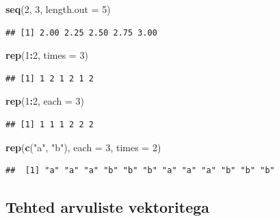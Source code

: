 \documentclass[]{book}
\newenvironment{Shaded}{\begin{snugshade}}{\end{snugshade}}
\newcommand{\KeywordTok}[1]{\textcolor[rgb]{0.13,0.29,0.53}{\textbf{#1}}}
\newcommand{\DataTypeTok}[1]{\textcolor[rgb]{0.13,0.29,0.53}{#1}}
\newcommand{\DecValTok}[1]{\textcolor[rgb]{0.00,0.00,0.81}{#1}}
\newcommand{\StringTok}[1]{\textcolor[rgb]{0.31,0.60,0.02}{#1}}
\newcommand{\OperatorTok}[1]{\textcolor[rgb]{0.81,0.36,0.00}{\textbf{#1}}}
\newcommand{\NormalTok}[1]{#1}
\begin{document}
\begin{Shaded}
\begin{Highlighting}[]
\KeywordTok{seq}\NormalTok{(}\DecValTok{2}\NormalTok{, }\DecValTok{3}\NormalTok{, }\DataTypeTok{length.out =} \DecValTok{5}\NormalTok{)}
\end{Highlighting}
\end{Shaded}

\begin{verbatim}
## [1] 2.00 2.25 2.50 2.75 3.00
\end{verbatim}

\begin{Shaded}
\begin{Highlighting}[]
\KeywordTok{rep}\NormalTok{(}\DecValTok{1}\OperatorTok{:}\DecValTok{2}\NormalTok{, }\DataTypeTok{times =} \DecValTok{3}\NormalTok{)}
\end{Highlighting}
\end{Shaded}

\begin{verbatim}
## [1] 1 2 1 2 1 2
\end{verbatim}

\begin{Shaded}
\begin{Highlighting}[]
\KeywordTok{rep}\NormalTok{(}\DecValTok{1}\OperatorTok{:}\DecValTok{2}\NormalTok{, }\DataTypeTok{each =} \DecValTok{3}\NormalTok{)}
\end{Highlighting}
\end{Shaded}

\begin{verbatim}
## [1] 1 1 1 2 2 2
\end{verbatim}

\begin{Shaded}
\begin{Highlighting}[]
\KeywordTok{rep}\NormalTok{(}\KeywordTok{c}\NormalTok{(}\StringTok{"a"}\NormalTok{, }\StringTok{"b"}\NormalTok{), }\DataTypeTok{each =} \DecValTok{3}\NormalTok{, }\DataTypeTok{times =} \DecValTok{2}\NormalTok{)}
\end{Highlighting}
\end{Shaded}

\begin{verbatim}
##  [1] "a" "a" "a" "b" "b" "b" "a" "a" "a" "b" "b" "b"
\end{verbatim}

\subsection{Tehted arvuliste
vektoritega}\label{tehted-arvuliste-vektoritega}
\end{document}
